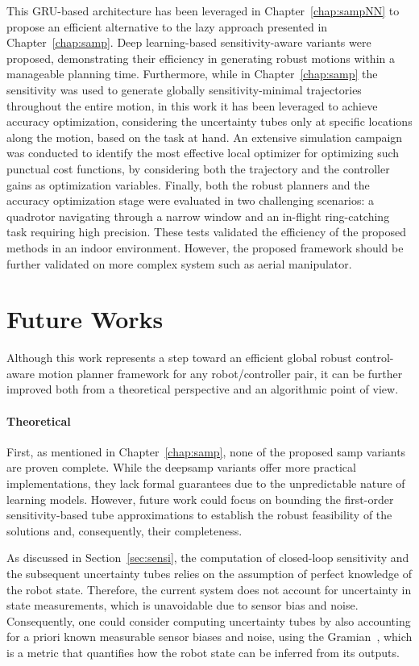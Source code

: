 This GRU-based architecture has been leveraged in Chapter~\ref{chap:sampNN} to propose an efficient alternative to the lazy approach presented in Chapter~\ref{chap:samp}.
Deep learning-based sensitivity-aware variants were proposed, demonstrating their efficiency in generating robust motions within a manageable planning time.
Furthermore, while in Chapter~\ref{chap:samp} the sensitivity was used to generate globally sensitivity-minimal trajectories throughout the entire motion, in this work it has been leveraged to achieve accuracy optimization, considering the uncertainty tubes only at specific locations along the motion, based on the task at hand.
An extensive simulation campaign was conducted to identify the most effective local optimizer for optimizing such punctual cost functions, by considering both the trajectory and the controller gains as optimization variables.
Finally, both the robust planners and the accuracy optimization stage were evaluated in two challenging scenarios: a quadrotor navigating through a narrow window and an in-flight ring-catching task requiring high precision. 
These tests validated the efficiency of the proposed methods in an indoor environment.
However, the proposed framework should be further validated on more complex system such as aerial manipulator.

\section{Future Works}

Although this work represents a step toward an efficient global robust control-aware motion planner framework for any robot/controller pair, it can be further improved both from a theoretical perspective and an algorithmic point of view.

\paragraph{Theoretical}

First, as mentioned in Chapter~\ref{chap:samp}, none of the proposed \gls{samp} variants are proven complete.
While the \gls{deepsamp} variants offer more practical implementations, they lack formal guarantees due to the unpredictable nature of learning models.
However, future work could focus on bounding the first-order sensitivity-based tube approximations to establish the robust feasibility of the  solutions and, consequently, their completeness.

As discussed in Section~\ref{sec:sensi}, the computation of closed-loop sensitivity and the subsequent uncertainty tubes relies on the assumption of perfect knowledge of the robot state. 
Therefore, the current system does not account for uncertainty in state measurements, which is unavoidable due to sensor bias and noise.
Consequently, one could consider computing uncertainty tubes by also accounting for a priori known measurable sensor biases and noise, using the Gramian~\cite{cGramian}, which is a metric that quantifies how the robot state can be inferred from its outputs.

